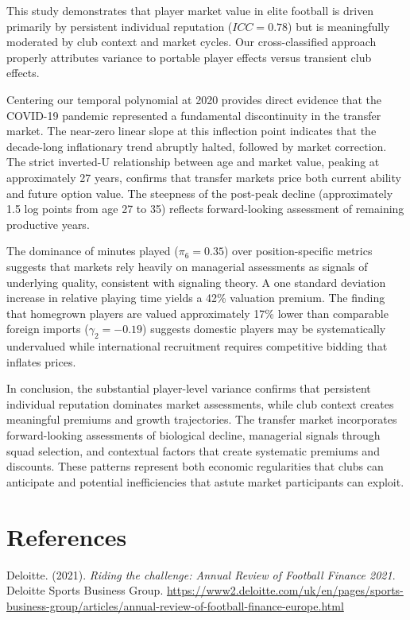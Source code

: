 \documentclass[
  12pt,
]{article}
\begin{document}
This study demonstrates that player market value in elite football is
driven primarily by persistent individual reputation (\(ICC=0.78\)) but
is meaningfully moderated by club context and market cycles. Our
cross-classified approach properly attributes variance to portable
player effects versus transient club effects.

Centering our temporal polynomial at 2020 provides direct evidence that
the COVID-19 pandemic represented a fundamental discontinuity in the
transfer market. The near-zero linear slope at this inflection point
indicates that the decade-long inflationary trend abruptly halted,
followed by market correction. The strict inverted-U relationship
between age and market value, peaking at approximately 27 years,
confirms that transfer markets price both current ability and future
option value. The steepness of the post-peak decline (approximately 1.5
log points from age 27 to 35) reflects forward-looking assessment of
remaining productive years.

The dominance of minutes played (\(\pi_6=0.35\)) over position-specific
metrics suggests that markets rely heavily on managerial assessments as
signals of underlying quality, consistent with signaling theory. A one
standard deviation increase in relative playing time yields a 42\%
valuation premium. The finding that homegrown players are valued
approximately 17\% lower than comparable foreign imports
(\(\gamma_2=-0.19\)) suggests domestic players may be systematically
undervalued while international recruitment requires competitive bidding
that inflates prices.

In conclusion, the substantial player-level variance confirms that
persistent individual reputation dominates market assessments, while
club context creates meaningful premiums and growth trajectories. The
transfer market incorporates forward-looking assessments of biological
decline, managerial signals through squad selection, and contextual
factors that create systematic premiums and discounts. These patterns
represent both economic regularities that clubs can anticipate and
potential inefficiencies that astute market participants can exploit.

\newpage

\section*{References}\label{references}

Deloitte. (2021). \emph{Riding the challenge: Annual Review of Football
Finance 2021}. Deloitte Sports Business Group.
\url{https://www2.deloitte.com/uk/en/pages/sports-business-group/articles/annual-review-of-football-finance-europe.html}
\end{document}

